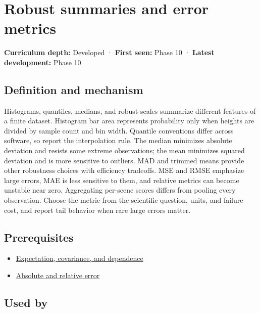 \hypertarget{appendix-bcc44e9d3d02}{}\label{referencestart:appendix-bcc44e9d3d02}
\section{Robust summaries and error metrics}\label{appendix-bcc44e9d3d02-robust-summaries-and-error-metrics}

\textbf{Curriculum depth:} Developed · \textbf{First seen:} Phase 10 · \textbf{Latest development:} Phase 10

\subsection{Definition and mechanism}\label{appendix-bcc44e9d3d02-definition-and-mechanism}

Histograms, quantiles, medians, and robust scales summarize different features of a finite dataset. Histogram bar area represents probability only when heights are divided by sample count and bin width. Quantile conventions differ across software, so report the interpolation rule. The median minimizes absolute deviation and resists some extreme observations; the mean minimizes squared deviation and is more sensitive to outliers. MAD and trimmed means provide other robustness choices with efficiency tradeoffs. MSE and RMSE emphasize large errors, MAE is less sensitive to them, and relative metrics can become unstable near zero. Aggregating per-scene scores differs from pooling every observation. Choose the metric from the scientific question, units, and failure cost, and report tail behavior when rare large errors matter.

\subsection{Prerequisites}\label{appendix-bcc44e9d3d02-prerequisites}

\begin{itemize}
\tightlist
\item
  \hyperref[appendix-54c383df9992]{Expectation, covariance, and dependence}
\item
  \hyperref[appendix-3ae74e89b4e6]{Absolute and relative error}
\end{itemize}

\subsection{Used by}\label{appendix-bcc44e9d3d02-used-by}

